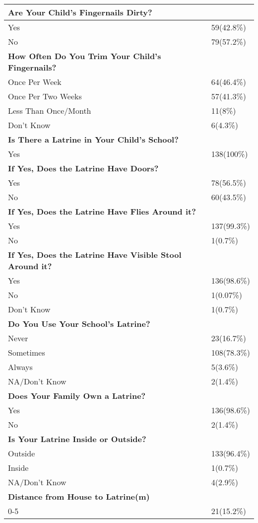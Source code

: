 \documentclass[6pt,letterpaper]{article}
\begin{document}
\begin{tabular}{|l  l|}
\hline
\textbf{Are Your Child's Fingernails Dirty?} \\
\hline
Yes & 59(42.8\%) \\
No & 79(57.2\%) \\
\hline
\textbf{How Often Do You Trim Your Child's Fingernails?} \\
\hline
Once Per Week & 64(46.4\%) \\
Once Per Two Weeks & 57(41.3\%) \\
Less Than Once/Month & 11(8\%) \\
Don't Know & 6(4.3\%) \\
\hline
\textbf{Is There a Latrine in Your Child's School?} \\
\hline
Yes & 138(100\%) \\
\hline
\textbf{If Yes, Does the Latrine Have Doors?} \\
\hline
Yes & 78(56.5\%) \\
No & 60(43.5\%) \\
\hline
\textbf{If Yes, Does the Latrine Have Flies Around it?} \\
\hline
Yes & 137(99.3\%) \\
No & 1(0.7\%) \\
\hline
\textbf{If Yes, Does the Latrine Have Visible Stool Around it?} \\
Yes & 136(98.6\%) \\
No & 1(0.07\%) \\
Don't Know & 1(0.7\%) \\
\hline
\textbf{Do You Use Your School's Latrine?} \\
\hline
Never & 23(16.7\%) \\
Sometimes & 108(78.3\%) \\
Always & 5(3.6\%) \\
NA/Don't Know & 2(1.4\%) \\
\hline
\textbf{Does Your Family Own a Latrine?} \\
\hline
Yes & 136(98.6\%) \\
No & 2(1.4\%) \\
\hline
\textbf{Is Your Latrine Inside or Outside?} \\
\hline
Outside & 133(96.4\%) \\
Inside & 1(0.7\%) \\
NA/Don't Know & 4(2.9\%) \\
\hline
\textbf{Distance from House to Latrine(m)} \\
\hline
0-5 & 21(15.2\%) \\

\end{tabular}
\end{document}
